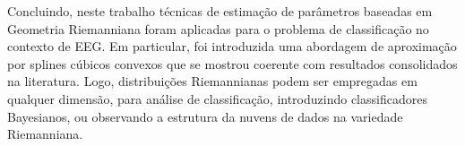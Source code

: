 \documentclass[a4paper,titlepage]{article}
\begin{document}
Concluindo, neste trabalho técnicas de estimação de parâmetros baseadas em
Geometria Riemanniana foram aplicadas para o problema de classificação no
contexto de EEG\@. Em particular, foi introduzida uma abordagem de aproximação
por splines cúbicos convexos que se mostrou coerente com resultados
consolidados na literatura. Logo, distribuições Riemannianas podem ser
empregadas em qualquer dimensão, para análise de classificação, introduzindo
classificadores Bayesianos, ou observando a estrutura da nuvens de dados na
variedade Riemanniana.  



%

\end{document}

